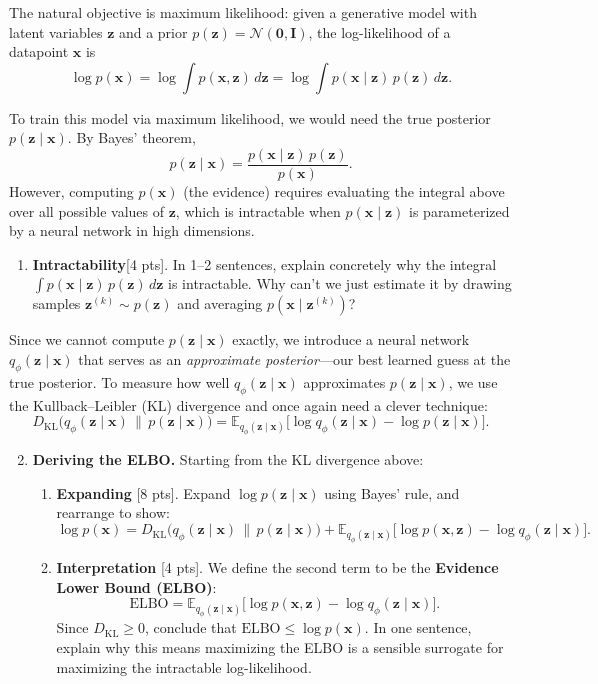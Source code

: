 \documentclass[submit]{../harvardml}
\newcommand{\E}{\mathbb{E}}
\newcommand{\KL}{D_{\mathrm{KL}}}
\newcommand{\bx}{\mathbf{x}}
\newcommand{\bz}{\mathbf{z}}
\begin{document}
\begin{problem}
\begin{enumerate}
The natural objective is maximum likelihood: given a generative model with latent variables $\bz$ and a prior $p(\bz) = \mathcal{N}(\bm{0}, \mathbf{I})$, the log-likelihood of a datapoint $\bx$ is
\[
  \log p(\bx) = \log \int p(\bx, \bz)\, d\bz = \log \int p(\bx \mid \bz)\, p(\bz)\, d\bz.
\]

To train this model via maximum likelihood, we would need the true posterior $p(\bz \mid \bx)$. By Bayes' theorem,
\[
  p(\bz \mid \bx) = \frac{p(\bx \mid \bz)\, p(\bz)}{p(\bx)}.
\]
However, computing $p(\bx)$ (the evidence) requires evaluating the integral above over all possible values of $\bz$, which is intractable when $p(\bx \mid \bz)$ is parameterized by a neural network in high dimensions.

\begin{enumerate}

\item \textbf{Intractability}[4 pts]. In 1--2 sentences, explain concretely why the integral $\int p(\bx \mid \bz)\,p(\bz)\,d\bz$ is intractable. Why can't we just estimate it by drawing samples $\bz^{(k)} \sim p(\bz)$ and averaging $p(\bx \mid \bz^{(k)})$?
\end{enumerate}

Since we cannot compute $p(\bz \mid \bx)$ exactly, we introduce a neural network $q_\phi(\bz \mid \bx)$ that serves as an \textit{approximate posterior}---our best learned guess at the true posterior. To measure how well $q_\phi(\bz \mid \bx)$ approximates $p(\bz \mid \bx)$, we use the Kullback--Leibler (KL) divergence and once again need a clever technique:
\[
  \KL\!\big(q_\phi(\bz \mid \bx) \,\|\, p(\bz \mid \bx)\big) = \E_{q_\phi(\bz \mid \bx)}\!\Big[\log q_\phi(\bz \mid \bx) - \log p(\bz \mid \bx)\Big].
\]

\begin{enumerate}
\setcounter{enumii}{1}
\item \textbf{Deriving the ELBO.} Starting from the KL divergence above:

\begin{enumerate}
  \item \textbf{Expanding} [8 pts]. Expand $\log p(\bz \mid \bx)$ using Bayes' rule, and rearrange to show:
  \[
    \log p(\bx) = \KL\!\big(q_\phi(\bz \mid \bx) \,\|\, p(\bz \mid \bx)\big) + \E_{q_\phi(\bz \mid \bx)}\!\Big[\log p(\bx, \bz) - \log q_\phi(\bz \mid \bx)\Big].
  \]

  \item \textbf{Interpretation} [4 pts]. We define the second term to be the \textbf{Evidence Lower Bound (ELBO)}:
  \[
    \mathrm{ELBO} = \E_{q_\phi(\bz \mid \bx)}\!\Big[\log p(\bx, \bz) - \log q_\phi(\bz \mid \bx)\Big].
  \]
  Since $\KL \geq 0$, conclude that $\mathrm{ELBO} \leq \log p(\bx)$. In one sentence, explain why this means maximizing the ELBO is a sensible surrogate for maximizing the intractable log-likelihood.


\end{enumerate}
\end{enumerate}
\end{enumerate}
\end{problem}
\end{document}

